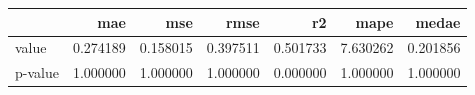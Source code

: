 \begin{tabular}{lrrrrrr}
\toprule
 & mae & mse & rmse & r2 & mape & medae \\
\midrule
value & 0.274189 & 0.158015 & 0.397511 & 0.501733 & 7.630262 & 0.201856 \\
p-value & 1.000000 & 1.000000 & 1.000000 & 0.000000 & 1.000000 & 1.000000 \\
\bottomrule
\end{tabular}
